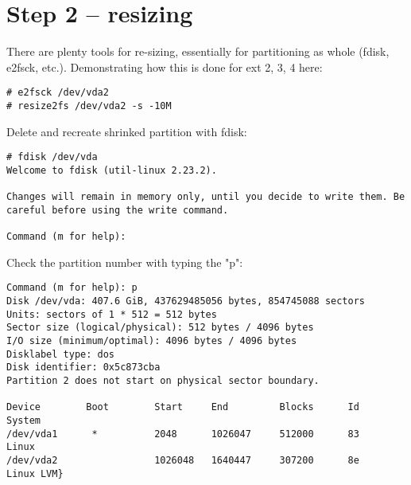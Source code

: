 \section{Step 2 -- resizing}
There are plenty tools for re-sizing, essentially for partitioning as whole (fdisk, e2fsck, etc.).
Demonstrating how this is done for ext 2, 3, 4 here:
\begin{lstlisting}[columns=fixed,basicstyle=\ttfamily\footnotesize,tabsize=4,backgroundcolor=\color{yellow!10}]
# e2fsck /dev/vda2
# resize2fs /dev/vda2 -s -10M
\end{lstlisting}
Delete and recreate shrinked partition with fdisk:
\begin{lstlisting}[columns=fixed,basicstyle=\ttfamily\footnotesize,tabsize=4,backgroundcolor=\color{yellow!10}]
# fdisk /dev/vda
Welcome to fdisk (util-linux 2.23.2).

Changes will remain in memory only, until you decide to write them. Be careful before using the write command.

Command (m for help):
\end{lstlisting}
Check the partition number with typing the "p":
\begin{lstlisting}[columns=fixed,basicstyle=\ttfamily\footnotesize,tabsize=4,backgroundcolor=\color{yellow!10}]
Command (m for help): p
Disk /dev/vda: 407.6 GiB, 437629485056 bytes, 854745088 sectors
Units: sectors of 1 * 512 = 512 bytes
Sector size (logical/physical): 512 bytes / 4096 bytes
I/O size (minimum/optimal): 4096 bytes / 4096 bytes
Disklabel type: dos
Disk identifier: 0x5c873cba
Partition 2 does not start on physical sector boundary.

Device        Boot        Start     End         Blocks      Id    System
/dev/vda1      *          2048      1026047     512000      83    Linux
/dev/vda2                 1026048   1640447     307200      8e    Linux LVM}
\end{lstlisting}



